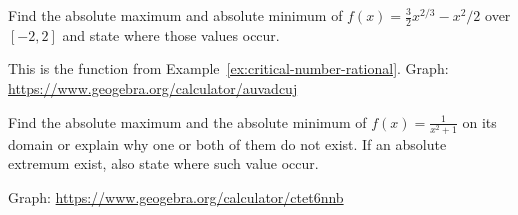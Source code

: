 \documentclass[../main.tex]{subfiles}
\begin{document}
  \begin{example} 
    Find the absolute maximum and absolute minimum of \(f(x) = \frac{3}{2} x^{2/3} - x^{2}/2\) over \([-2,2]\) and state where those values occur.

    This is the function from Example~\ref{ex:critical-number-rational}. Graph: \url{https://www.geogebra.org/calculator/auvadcuj}

  \end{example}
  \clearpage

  \begin{example} \label{ex:extremum-open-interval}
    Find the absolute maximum and the absolute minimum of \(f(x) = \frac{1}{x^{2}+1}\) on its domain or explain why one or both of them do not exist. If an absolute extremum exist, also state where such value occur.

    Graph: \url{https://www.geogebra.org/calculator/ctet6nnb}

  \end{example}
\end{document}
